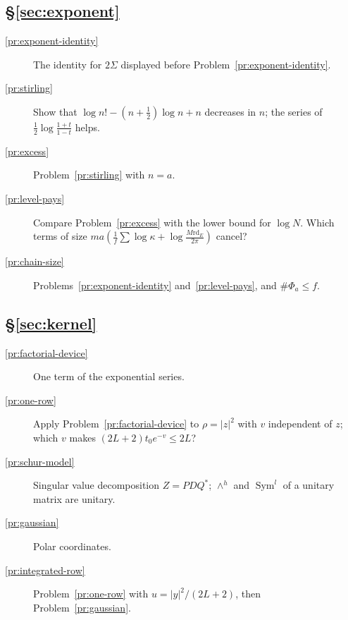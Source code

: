 \documentclass[reqno]{amsart}
\theoremstyle{definition}
\theoremstyle{plain}
\theoremstyle{remark}
\newcommand{\rd}{\mathrm{rd}_E}
\newcommand{\Sym}{\operatorname{Sym}}
\begin{document}
\subsection*{\S\ref{sec:exponent}}
\begin{description}
\item[\ref{pr:exponent-identity}] The identity for \(2\Sigma\) displayed before Problem~\ref{pr:exponent-identity}.
\item[\ref{pr:stirling}] Show that \(\log n! - (n + \frac12)\log n + n\) decreases in \(n\); the series of \(\frac12\log\frac{1+t}{1-t}\) helps.
\item[\ref{pr:excess}] Problem~\ref{pr:stirling} with \(n = a\).
\item[\ref{pr:level-pays}] Compare Problem~\ref{pr:excess} with the lower bound for \(\log N\).  Which terms of size \(ma(\frac1f\sum\log\kappa + \log\frac{M\rd}{2\pi})\) cancel?
\item[\ref{pr:chain-size}] Problems~\ref{pr:exponent-identity} and~\ref{pr:level-pays}, and \(\#\Phi_a \le f\).
\end{description}

\subsection*{\S\ref{sec:kernel}}
\begin{description}
\item[\ref{pr:factorial-device}] One term of the exponential series.
\item[\ref{pr:one-row}] Apply Problem~\ref{pr:factorial-device} to \(\rho = \lvert z\rvert^2\) with \(v\) independent of \(z\); which \(v\) makes \((2L + 2)t_0e^{-v} \le 2L\)?
\item[\ref{pr:schur-model}] Singular value decomposition \(Z = P D Q^*\); \(\wedge^h\) and \(\Sym^l\) of a unitary matrix are unitary.
\item[\ref{pr:gaussian}] Polar coordinates.
\item[\ref{pr:integrated-row}] Problem~\ref{pr:one-row} with \(u = \lvert y\rvert^2/(2L + 2)\), then Problem~\ref{pr:gaussian}.
\end{description}
\end{document}
